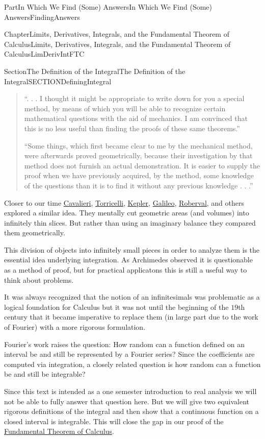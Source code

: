 \documentclass[oneside,10pt,]{book}
\numberwithin{equation}{part}
\begin{document}
\begin{partptx}{Part}{In Which We Find (Some) Answers}{}{In Which We Find (Some) Answers}{}{}{FindingAnswers}
\begin{chapterptx}{Chapter}{Limits, Derivatives, Integrals, and the Fundamental Theorem of Calculus}{}{Limits, Derivatives, Integrals, and the Fundamental Theorem of Calculus}{}{}{LimDerivIntFTC}
\begin{sectionptx}{Section}{The Definition of the Integral}{}{The Definition of the Integral}{}{}{SECTIONDefiningIntegral}
\begin{introduction}{}
\begin{quote}%
``. . . I thought it might be appropriate to write down for you a special method, by means of which you will be able to recognize certain mathematical questions with the aid of mechanics.  I am convinced that this is no less useful than finding the proofs of these same theorems.''%
\par
``Some things, which first became clear to me by the mechanical method, were afterwards proved geometrically, because their investigation by that method does not furnish an actual demonstration.  It is easier to supply the proof when we have previously acquired, by the method, some knowledge of the questions than it is to find it without any previous knowledge . . .''%
\end{quote}
Closer to our time \href{https://mathshistory.st-andrews.ac.uk/Biographies/Cavalieri/}{Cavalieri}, \href{https://mathshistory.st-andrews.ac.uk/Biographies/Torricelli/}{Torricelli}, \href{https://mathshistory.st-andrews.ac.uk/Biographies/Kepler/}{Kepler}, \href{https://mathshistory.st-andrews.ac.uk/Biographies/Galileo/}{Galileo}, \href{https://mathshistory.st-andrews.ac.uk/Biographies/Roberval/}{Roberval}, and others explored a similar idea. They mentally cut geometric areas (and volumes) into infinitely thin slices.  But rather than using an imaginary balance they compared them geometrically.%
\par
This division of objects into infinitely small pieces in order to analyze them is the essential idea underlying integration. As Archimedes observed it is questionable as a method of proof, but for practical applicatons this is still a useful way to think about problems.%
\par
It was always recognized that the notion of an infinitesimals was problematic as a logical foundation for Calculus but it was not until  the beginning of the \(19\)th century that it became imperative to replace them (in large part due to the work of Fourier) with a more rigorous formulation.%
\par
Fourier's work raises the question: How random can a function defined on an interval be and still be represented by a Fourier series?  Since the coefficients are computed via integration, a closely related question is how random can a function be and still be integrable?%
\par
Since this text is intended as a one semester introduction to real analysis we will not be able to fully answer that question here.  But we will give two equivalent rigorous definitions of the integral and then show that a continuous function on a closed interval is integrable.  This will close the gap in our proof of the \hyperref[THEOREMFTCCauchy]{Fundamental Theorem of Calculus}.      %

\end{introduction}
\end{sectionptx}
\end{chapterptx}
\end{partptx}
\end{document}
